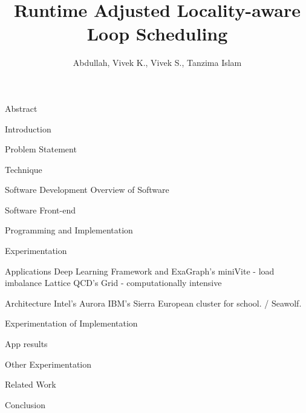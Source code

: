 \documentclass[12pt]{article}
\title{Runtime Adjusted Locality-aware Loop Scheduling}
\author{Abdullah, Vivek K., Vivek S., Tanzima Islam}
\begin{document}
 

\begin{outline}[enumerate] 

\1 Abstract 
 
    
\1 Introduction 

\1 Problem Statement 

\1 Technique 
   \2 
   \2 
   \2 
   \2 

\1 Software Development 
  \2 Overview of Software 
   
  \2 Software Front-end 
  
  \2 Programming and Implementation 


\1 Experimentation 

    \2 Applications 
       \3 Deep Learning Framework and ExaGraph's miniVite - load imbalance 
       \3 Lattice QCD's Grid - computationally intensive 
       
    \2 Architecture 
        \3 Intel's Aurora
        \3 IBM's Sierra 
        \3 European cluster for school. / Seawolf. 
        
    \2 Experimentation of Implementation 
       
    \2 App results 
    
    \2 Other Experimentation 
       
\1 Related Work
    \2 
    \2
    \2 

\1 Conclusion 

    \2 
    \2
    \2 

\end{outline}
\end{document}
